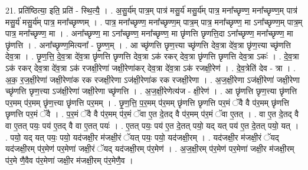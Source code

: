 \documentclass[17pt]{extarticle}
\begin{document}
21. प्रति॑ष्ठित्या॒ इति॒ प्रति॑ - स्थि॒त्यै॒ । . अ॒सु॒र्य॑म् पात्र॒म् पात्र॑ मसु॒र्य॑ मसु॒र्य॑म् पात्र॒ मना᳚च्छृण्ण॒ मना᳚च्छृण्ण॒म् पात्र॑ मसु॒र्य॑ मसु॒र्य॑म् पात्र॒ मना᳚च्छृण्णम् । . पात्र॒ मना᳚च्छृण्ण॒ मना᳚च्छृण्ण॒म् पात्र॒म् पात्र॒ मना᳚च्छृण्ण॒ मा ऽना᳚च्छृण्ण॒म् पात्र॒म् पात्र॒ मना᳚च्छृण्ण॒ मा । . अना᳚च्छृण्ण॒ मा ऽना᳚च्छृण्ण॒ मना᳚च्छृण्ण॒ मा छृ॑णत्ति छृणत्ति॒दा ऽना᳚च्छृण्ण॒ मना᳚च्छृण्ण॒ मा छृ॑णत्ति । . अना᳚च्छृण्ण॒मित्यना᳚ - छृ॒ण्ण॒म् । . आ च्छृ॑णत्ति छृण॒त्त्या च्छृ॑णत्ति देव॒त्रा दे॑व॒त्रा छृ॑ण॒त्त्या च्छृ॑णत्ति देव॒त्रा । . छृ॒ण॒त्ति॒ दे॒व॒त्रा दे॑व॒त्रा छृ॑णत्ति छृणत्ति देव॒त्रा ऽक॑ रकर् देव॒त्रा छृ॑णत्ति छृणत्ति देव॒त्रा ऽकः॑ । . दे॒व॒त्रा ऽक॑ रकर् देव॒त्रा दे॑व॒त्रा ऽक॑ रजक्षी॒रेणा॑ जक्षी॒रेणा॑कर् देव॒त्रा दे॑व॒त्रा ऽक॑ रजक्षी॒रेण॑ । . दे॒व॒त्रेति॑ देव - त्रा । . अ॒क॒ र॒ज॒क्षी॒रेणा॑ जक्षी॒रेणा॑क रक रजक्षी॒रेणा ऽज॑क्षी॒रेणा॑क रक रजक्षी॒रेणा । . अ॒ज॒क्षी॒रेणा ऽज॑क्षी॒रेणा॑ जक्षी॒रेणा च्छृ॑णत्ति छृण॒त्त्या ऽज॑क्षी॒रेणा॑ जक्षी॒रेणा च्छृ॑णत्ति । . अ॒ज॒क्षी॒रेणेत्य॑ज - क्षी॒रेण॑ । . आ छृ॑णत्ति छृण॒त्त्या छृ॑णत्ति पर॒मम् प॑र॒मम् छृ॑ण॒त्त्या छृ॑णत्ति पर॒मम् । . छृ॒ण॒त्ति॒ प॒र॒मम् प॑र॒मम् छृ॑णत्ति छृणत्ति पर॒मं ॅवै वै प॑र॒मम् छृ॑णत्ति छृणत्ति पर॒मं ॅवै । . प॒र॒मं ॅवै वै प॑र॒मम् प॑र॒मं ॅवा ए॒त दे॒तद् वै प॑र॒मम् प॑र॒मं ॅवा ए॒तत् । . वा ए॒त दे॒तद् वै वा ए॒तत् पयः॒ पय॑ ए॒तद् वै वा ए॒तत् पयः॑ । . ए॒तत् पयः॒ पय॑ ए॒त दे॒तत् पयो॒ यद् यत् पय॑ ए॒त दे॒तत् पयो॒ यत् । . पयो॒ यद् यत् पयः॒ पयो॒ यद॑जक्षी॒र म॑जक्षी॒रं ॅयत् पयः॒ पयो॒ यद॑जक्षी॒रम् । . यद॑जक्षी॒र म॑जक्षी॒रं ॅयद् यद॑जक्षी॒रम् प॑र॒मेण॑ पर॒मेणा॑ जक्षी॒रं ॅयद् यद॑जक्षी॒रम् प॑र॒मेण॑ । . अ॒ज॒क्षी॒रम् प॑र॒मेण॑ पर॒मेणा॑ जक्षी॒र म॑जक्षी॒रम् प॑र॒मे णै॒वैव प॑र॒मेणा॑ जक्षी॒र म॑जक्षी॒रम् प॑र॒मेणै॒व । \newline
\end{document}
